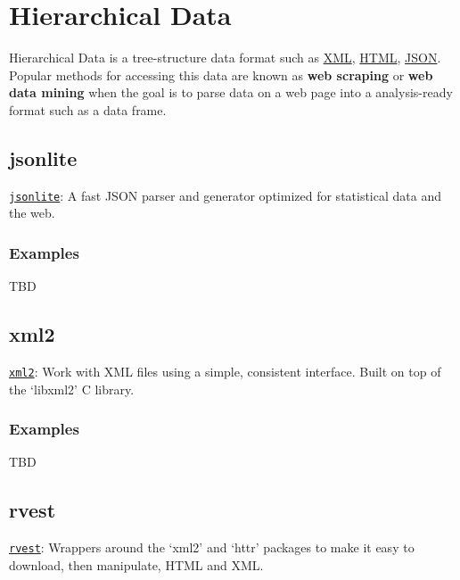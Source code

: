 \documentclass[]{book}
\begin{document}
\section{\texorpdfstring{\textbf{Hierarchical
Data}}{Hierarchical Data}}\label{hierarchical-data}

Hierarchical Data is a tree-structure data format such as
\href{https://en.wikipedia.org/wiki/XML}{XML},
\href{https://en.wikipedia.org/wiki/HTML}{HTML},
\href{https://en.wikipedia.org/wiki/JSON}{JSON}. Popular methods for
accessing this data are known as \textbf{web scraping} or \textbf{web
data mining} when the goal is to parse data on a web page into a
analysis-ready format such as a data frame.

\subsection{\texorpdfstring{\textbf{jsonlite
}}{jsonlite }}\label{jsonlite}

\href{https://CRAN.R-project.org/package=jsonlite}{\texttt{jsonlite}}: A
fast JSON parser and generator optimized for statistical data and the
web.

\subsubsection{\texorpdfstring{\textbf{Examples
}}{Examples }}\label{examples-2}

TBD

\subsection{\texorpdfstring{\textbf{xml2 }}{xml2 }}\label{xml2}

\href{https://CRAN.R-project.org/package=xml2}{\texttt{xml2}}: Work with
XML files using a simple, consistent interface. Built on top of the
`libxml2' C library.

\subsubsection{\texorpdfstring{\textbf{Examples
}}{Examples }}\label{examples-3}

TBD

\subsection{\texorpdfstring{\textbf{rvest }}{rvest }}\label{rvest}

\href{https://CRAN.R-project.org/package=rvest}{\texttt{rvest}}:
Wrappers around the `xml2' and `httr' packages to make it easy to
download, then manipulate, HTML and XML.
\end{document}
